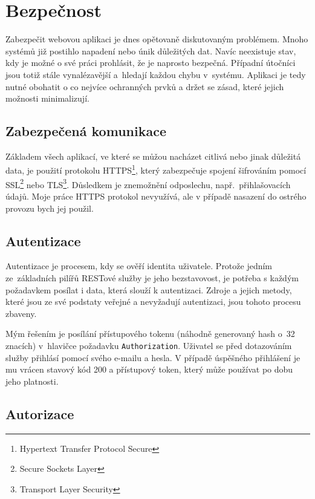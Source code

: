 \section{Bezpečnost}
\label{sec:security}


Zabezpečit webovou aplikaci je dnes opětovaně diskutovaným problémem. Mnoho systémů již postihlo napadení
nebo únik důležitých dat. Navíc neexistuje stav, kdy je možné o své práci prohlásit, že je naprosto
bezpečná. Případní útočníci jsou totiž stále vynalézavější a~hledají každou chybu v~systému.
Aplikaci je tedy nutné obohatit o co nejvíce ochranných prvků a držet se zásad,
které jejich možnosti minimalizují.

\subsection{Zabezpečená komunikace}

Základem všech aplikací, ve které se můžou nacházet citlivá nebo jinak důležitá data,
je použití protokolu HTTPS\footnote{Hypertext Transfer Protocol Secure},
který zabezpečuje spojení šifrováním pomocí SSL\footnote{Secure Sockets Layer} nebo TLS\footnote{Transport Layer Security}.
Důsledkem je znemožnění odposlechu, např.~přihlašovacích údajů. Moje práce HTTPS protokol nevyužívá,
ale v případě nasazení do ostrého provozu bych jej použil.

\subsection{Autentizace}

Autentizace je procesem, kdy se ověří identita uživatele. Protože jedním ze~základních pilířů RESTové
služby je jeho bezstavovost, je potřeba s každým požadavkem posílat i data, která slouží k autentizaci.
Zdroje a jejich metody, které jsou ze své podstaty veřejné a nevyžadují autentizaci, jsou tohoto procesu zbaveny.

Mým řešením je posílání přístupového tokenu (náhodně generovaný hash o~32 znacích) v~hlavičce požadavku
\texttt{Authorization}. Uživatel se před dotazováním služby přihlásí pomocí svého e-mailu a hesla.
V případě úspěšného přihlášení je mu vrácen stavový kód 200 a přístupový token, který může používat po dobu jeho platnosti.

\subsection{Autorizace}

